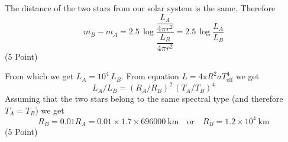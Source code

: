 The distance of the two stars from our solar system is the same. Therefore
\[
  m_B - m_A = 2.5\,\log\frac{\dfrac{L_A}{4\pi r^2}}{\dfrac{L_B}{4\pi r^2}}
            = 2.5\,\log\frac{L_A}{L_B}
\]
\hfill(5 Point)

From which we get $L_A = 10^4\,L_B$. From equation
$L = 4\pi R^2 \sigma T_{\mathrm{eff}}^4$ we get
\[
  L_A/L_B = (R_A/R_B)^2\,(T_A/T_B)^4
\]
Assuming that the two stars belong to the same spectral type (and therefore
$T_A = T_B$) we get
\[
  R_B = 0.01 R_A = 0.01 \times 1.7 \times 696000\ \mathrm{km}
  \quad\text{or}\quad R_B = 1.2\times10^{4}\ \mathrm{km}
\]
\hfill(5 Point)
